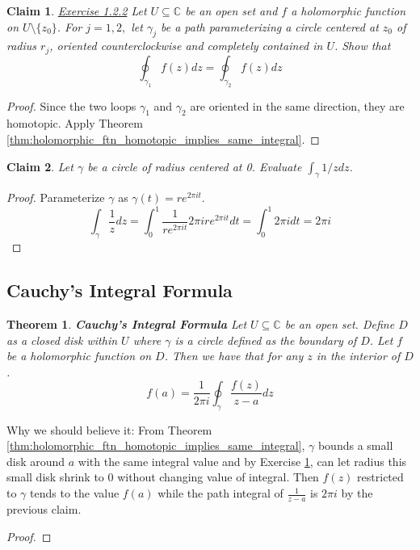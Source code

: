\documentclass{article}
\newtheorem{theorem}{Theorem}[section]
\newtheorem{claim}{Claim}[section]
\theoremstyle{definition}
\newcommand{\CC}{\mathbb{C}}
\begin{document}
\begin{claim}\label{exc:blue_book_1.2.2}
\underline{Exercise 1.2.2}
Let $U \subseteq \CC$ be an open set and $f$ a holomorphic function on $U\setminus \{z_0\}$. For $j=1,2,$ let $\gamma_j$ be a path parameterizing a circle centered at $z_0$ of radius $r_j$, oriented counterclockwise and completely contained in $U$. Show that 
\begin{equation*}
    \oint_{\gamma_1} f(z) dz = \oint_{\gamma_2} f(z) dz
\end{equation*}
\end{claim}
\begin{proof}
Since the two loops $\gamma_1$ and $\gamma_2$ are oriented in the same direction, they are homotopic. Apply Theorem \ref{thm:holomorphic_ftn_homotopic_implies_same_integral}.
\end{proof}

\begin{claim}
Let $\gamma$ be a circle of radius centered at 0. Evaluate $\int_{\gamma} 1/z dz$.
\end{claim}
\begin{proof}
Parameterize $\gamma$ as $\gamma(t) = re^{2{\pi}it}$.
\begin{equation*}
    \int_{\gamma} \frac{1}{z} dz 
    = \int_0^1 \frac{1}{re^{2{\pi}it}} 2{\pi}ire^{2{\pi}it} dt
    = \int_0^1 2{\pi}i dt 
    = 2{\pi}i
\end{equation*}
\end{proof}

\subsection{Cauchy's Integral Formula}
\begin{theorem}
\textbf{Cauchy's Integral Formula} Let $U \subseteq \CC$ be an open set. Define $D$ as a closed disk within $U$ where $\gamma$ is a circle defined as the boundary of $D$. Let $f$ be a holomorphic function on $D$. Then we have that for any $z$ in the \emph{interior} of $D$. 
\begin{equation*}
    f(a) = \frac{1}{2{\pi}i} \oint_{\gamma} \frac{f(z)}{z-a} dz
\end{equation*}
\end{theorem}
Why we should believe it: From Theorem \ref{thm:holomorphic_ftn_homotopic_implies_same_integral}, $\gamma$ bounds a small disk around $a$ with the same integral value and by Exercise \ref{exc:blue_book_1.2.2}, can let radius this small disk shrink to 0 without changing value of integral. Then $f(z)$ restricted to $\gamma$ tends to the value $f(a)$ while the path integral of $\frac{1}{z-a}$ is $2{\pi}i$ by the previous claim.
\begin{proof}

\end{proof}
\end{document}
